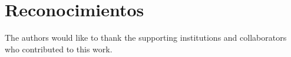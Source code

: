 \section*{Reconocimientos}
The authors would like to thank the supporting institutions and collaborators who contributed to this work.

